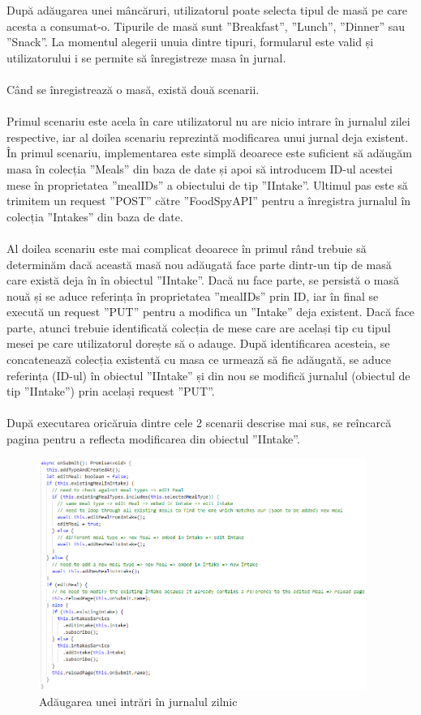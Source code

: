 După adăugarea unei mâncăruri, utilizatorul poate selecta tipul de masă pe care acesta a consumat-o. Tipurile de masă sunt ”Breakfast”, ”Lunch”, ”Dinner” sau ”Snack”. La momentul alegerii unuia dintre tipuri, formularul este valid și utilizatorului i se permite să înregistreze masa în jurnal.
\\ \\
Când se înregistrează o masă, există două scenarii.
\\ \\
Primul scenariu este acela în care utilizatorul nu are nicio intrare în jurnalul zilei respective, iar al doilea scenariu reprezintă modificarea unui jurnal deja existent.
În primul scenariu, implementarea este simplă deoarece este suficient să adăugăm masa în colecția ”Meals” din baza de date și apoi să introducem ID-ul acestei mese în proprietatea ”mealIDs” a obiectului de tip ”IIntake”. Ultimul pas este să trimitem un request ”POST” către ”FoodSpyAPI” pentru a înregistra jurnalul în colecția ”Intakes” din baza de date.
\\ \\
Al doilea scenariu este mai complicat deoarece în primul rând trebuie să determinăm dacă această masă nou adăugată face parte dintr-un tip de masă care există deja în în obiectul ”IIntake”.
Dacă nu face parte, se persistă o masă nouă și se aduce referința în proprietatea ”mealIDs” prin ID, iar în final se execută un request ”PUT” pentru a modifica un ”Intake” deja existent. Dacă face parte, atunci trebuie identificată colecția de mese care are același tip cu tipul mesei pe care utilizatorul dorește să o adauge. După identificarea acesteia, se concatenează colecția existentă cu masa ce urmează să fie adăugată, se aduce referința (ID-ul) în obiectul ”IIntake” și din nou se modifică jurnalul (obiectul de tip ”IIntake”) prin același request ”PUT”.
\\ \\
După executarea oricăruia dintre cele 2 scenarii descrise mai sus, se reîncarcă pagina pentru a reflecta modificarea din obiectul ”IIntake”.

\begin{figure}[!htb]
	\centering
	\includegraphics[width=0.95\textwidth]
	{../LaTeX/Images/implementare_addmeal.PNG}
	\caption{Adăugarea unei intrări în jurnalul zilnic}
	\label{fig:610}
\end{figure}

